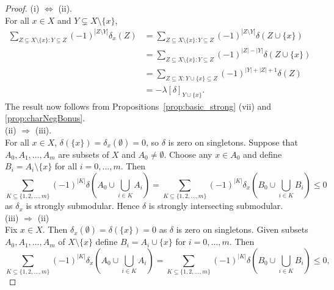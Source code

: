 \documentclass{article}
\theoremstyle{plain}
\theoremstyle{definition}
\begin{document}
\begin{proof}
(i) $\Leftrightarrow$ (ii).\\
For all $x \in X$ and $Y \subsetneq X \setminus \{x\}$, 
\begin{align*}
\sum_{Z \subseteq X \setminus \{x\}:Y \subseteq Z} (-1)^{|Z \setminus Y|} \delta_x(Z)  & = \sum_{Z \subseteq X \setminus \{x\}:Y \subseteq Z} (-1)^{|Z \setminus Y|} \delta(Z \cup \{x\}) \\
& =   \sum_{Z \subseteq X \setminus \{x\} :Y \subseteq Z} (-1)^{|Z| - |Y|} \delta(Z \cup \{x\})  \\
& =  \sum_{Z \subseteq X: Y \cup \{x\} \subseteq Z} (-1)^{|Y| + |Z| + 1} \delta(Z) \\
& = -\lambda[\delta]_{Y \cup \{x\}}.
\end{align*}
The result now follows from Propositions~\ref{prop:basic_strong} (vii) and \ref{prop:charNegBonus}. \\
(ii) $\Rightarrow$ (iii).\\
For all $x \in X$, $\delta(\{x\}) = \delta_x(\emptyset) = 0$, so $\delta$ is zero on singletons. Suppose that $A_0,A_1,\ldots,A_m$ are subsets of $X$ and $A_0 \neq \emptyset$. Choose any $x \in A_0$ and define 
$B_i = A_i \setminus \{x\}$ for all $i=0,\ldots,m$. 
Then 
\[\sum_{K \subseteq \{1,2,\ldots,m\}} (-1)^{|K|} \delta \left(A_0 \cup \bigcup_{i \in K} A_i \right) = \sum_{K \subseteq \{1,2,\ldots,m\}} (-1)^{|K|} \delta_x \left(B_0 \cup \bigcup_{i \in K} B_i \right)  \leq 0\]
as $\delta_x$ is strongly submodular. Hence $\delta$ is strongly intersecting submodular.\\
(iii) $\Rightarrow$ (ii) \\
Fix $x \in X$. Then $\delta_x(\emptyset) = \delta(\{x\}) = 0$ as $\delta$ is zero on singletons. Given subsets $A_0,A_1,\ldots,A_m$ of $X \setminus \{x\}$ define $B_i = A_i \cup \{x\}$ for $i=0,\ldots,m$. Then 
\[\sum_{K \subseteq \{1,2,\ldots,m\}} (-1)^{|K|} \delta_x\left(A_0 \cup \bigcup_{i \in K} A_i \right) = \sum_{K \subseteq \{1,2,\ldots,m\}} (-1)^{|K|} \delta\left(B_0 \cup \bigcup_{i \in K} B_i \right) \leq 0,\]

\end{proof}
\end{document}
